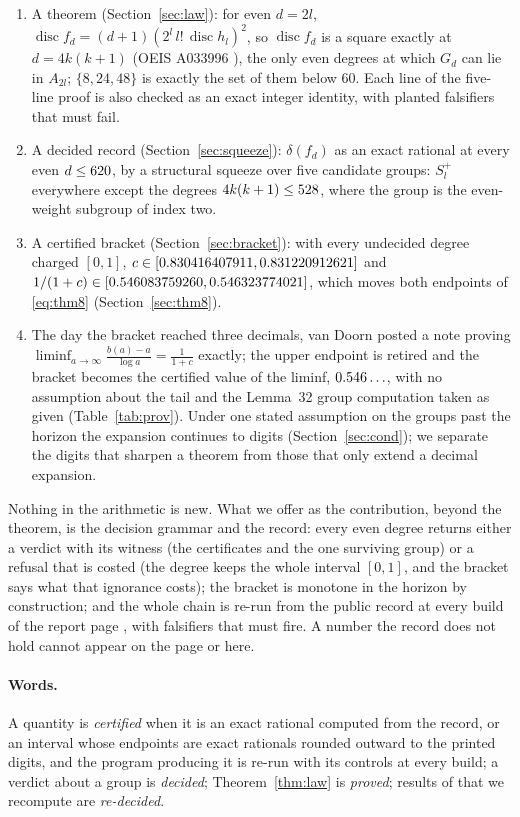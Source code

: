 \documentclass[11pt]{article}
\DeclareMathOperator{\disc}{disc}
\newcommand{\lia}{\liminf_{a\to\infty}\frac{b(a)-a}{\log a}}
\newcommand{\Sl}{S_l^{+}}
\begin{document}
\begin{enumerate}
\item A theorem (Section~\ref{sec:law}): for even $d=2l$, $\disc f_d=(d+1)(2^l\,l!\,\disc h_l)^2$, so $\disc f_d$ is a square exactly at $d=4k(k+1)$ (OEIS A033996 \cite{OEIS}), the only even degrees at which $G_d$ can lie in $A_{2l}$; $\{8,24,48\}$ is exactly the set of them below $60$. Each line of the five-line proof is also checked as an exact integer identity, with planted falsifiers that must fail.
\item A decided record (Section~\ref{sec:squeeze}): $\delta(f_d)$ as an exact rational at every even $d\le620$, by a structural squeeze over five candidate groups: $\Sl$ everywhere except the \ExcCount{} degrees $4k(k+1)\le528$, where the group is the even-weight subgroup of index two.
\item A certified bracket (Section~\ref{sec:bracket}): with every undecided degree charged $[0,1]$, $c\in[0.830416407911,0.831220912621]$ and $1/(1+c)\in[0.546083759260,0.546323774021]$, which moves both endpoints of \eqref{eq:thm8} (Section~\ref{sec:thm8}).
\item The day the bracket reached three decimals, van Doorn posted a note \cite{vD26} proving $\lia=\frac1{1+c}$ exactly; the upper endpoint is retired and the bracket becomes the certified value of the liminf, $0.546\ldots$, with no assumption about the tail and the Lemma~32 group computation taken as given (Table~\ref{tab:prov}). Under one stated assumption on the groups past the horizon the expansion continues to \CStarDigits{} digits (Section~\ref{sec:cond}); we separate the digits that sharpen a theorem from those that only extend a decimal expansion.
\end{enumerate}

Nothing in the arithmetic is new. What we offer as the contribution, beyond the theorem, is the decision grammar and the record: every even degree returns either a verdict with its witness (the certificates and the one surviving group) or a refusal that is costed (the degree keeps the whole interval $[0,1]$, and the bracket says what that ignorance costs); the bracket is monotone in the horizon by construction; and the whole chain is re-run from the public record at every build of the report page \cite{Report}, with falsifiers that must fire. A number the record does not hold cannot appear on the page or here.

\paragraph{Words.} A quantity is \emph{certified} when it is an exact rational computed from the record, or an interval whose endpoints are exact rationals rounded outward to the printed digits, and the program producing it is re-run with its controls at every build; a verdict about a group is \emph{decided}; Theorem~\ref{thm:law} is \emph{proved}; results of \cite{vD24} that we recompute are \emph{re-decided}.
\end{document}
